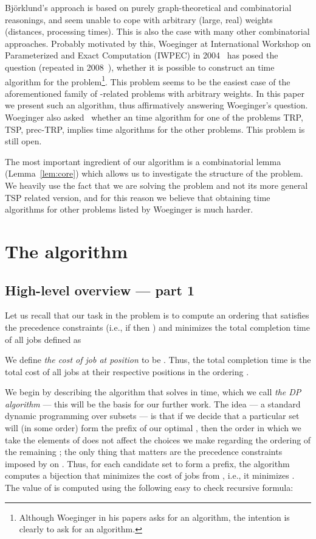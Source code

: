 \documentclass{article}
\theoremstyle{definition}
\begin{document}
Bj\"{o}rklund's approach is based on purely graph-theoretical and combinatorial reasonings,
and seem unable to cope with arbitrary (large, real) weights (distances, processing times).
This is also the case with many other combinatorial approaches.
Probably motivated by this,
Woeginger at International Workshop on Parameterized and Exact Computation
(IWPEC) in 2004~\cite{woeginger04} has posed the question (repeated in 2008~\cite{woeginger08}),
whether it is possible to construct an  time algorithm for the \schedname{} problem\footnote{Although Woeginger in his papers asks for an  algorithm, the intention is clearly to ask for an  algorithm.}.
This problem seems to be the easiest case of the aforementioned
family of {}-related problems with arbitrary weights.
In this paper we present such an algorithm, thus affirmatively answering Woeginger's question.
Woeginger also asked~\cite{woeginger04,woeginger08} whether an  time algorithm
for one of the problems {\sc TRP}, {\sc TSP}, prec-{\sc TRP}, \schedname{} implies 
time algorithms for the other problems. This problem is still open.

The most important ingredient of our algorithm is a combinatorial lemma (Lemma~\ref{lem:core})
which allows us to investigate the structure of the \schedname{} problem.
We heavily use the fact that we are solving the \schedname{} problem and
not its more general TSP related version, and for this reason
we believe that obtaining  time algorithms for other problems
listed by Woeginger is much harder.

\section{The algorithm}

\subsection{High-level overview --- part 1}\label{sec:high-level1}
Let us recall that our task in the \schedname{} problem is to compute an ordering 
that satisfies the precedence constraints (i.e., if  then )
and minimizes the total completion time of all jobs defined as

We define {\em{the cost of job  at position }} to be .
Thus, the total completion time is the total cost of all jobs at their respective
positions in the ordering .

We begin by describing the algorithm that solves \schedname in  time, which we call {\em{the DP algorithm}}
--- this will be the basis for our further work.
The idea --- a standard dynamic programming over subsets --- is that if we decide that a particular
set  will (in some order) form the prefix of our optimal , then the order
in which we take the elements of  does not affect the choices we make regarding the ordering
of the remaining ; the only thing that matters are the precedence constraints
imposed by  on . Thus, for each candidate set  to form a prefix,
the algorithm computes a bijection
 that minimizes the cost of jobs from , i.e.,
it minimizes .
The value of  is computed using the following easy to check recursive formula:
\end{document}
